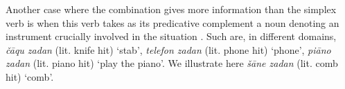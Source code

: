 \documentclass[output=paper
	        ,collection
	        ,collectionchapter
 	        ,biblatex
                ,babelshorthands
                ,newtxmath
                ,draftmode
                ,colorlinks, citecolor=brown
]{langscibook}
\begin{document}
{\begin{exe}
\end{exe}

Another case where the combination gives more information than the simplex verb is when this verb takes as its predicative complement a noun denoting an instrument crucially involved in the situation \citep{bonami2010persian}. Such are, in different domains, \emph{\v c\=aqu zadan} (lit. knife hit) `stab', \emph{telefon zadan} (lit. phone hit) `phone', \emph{pi\=ano zadan} (lit. piano hit) `play the piano'. We illustrate here \emph{\v s\=ane zadan} (lit. comb hit) `comb'.    

\z

\begin{exe}
\end{exe}

}
\end{document}
